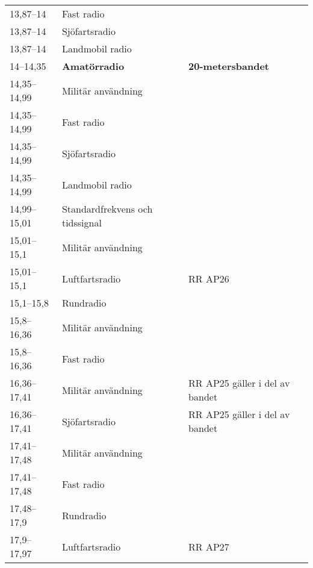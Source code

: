 \begin{landscape}
\begin{longtable}{lll}
13,87--14         & Fast radio                       &                                 \\
13,87--14         & Sjöfartsradio                    &                                 \\
13,87--14         & Landmobil radio                  &                                 \\
14--14,35         & \textbf{Amatörradio}             & \textbf{20-metersbandet}        \\
14,35--14,99      & Militär användning               &                                 \\
14,35--14,99      & Fast radio                       &                                 \\
14,35--14,99      & Sjöfartsradio                    &                                 \\
14,35--14,99      & Landmobil radio                  &                                 \\
14,99--15,01      & Standardfrekvens och tidssignal  &                                 \\
15,01--15,1       & Militär användning               &                                 \\
15,01--15,1       & Luftfartsradio                   & RR AP26                         \\
15,1--15,8        & Rundradio                        &                                 \\
15,8--16,36       & Militär användning               &                                 \\
15,8--16,36       & Fast radio                       &                                 \\
16,36--17,41      & Militär användning               & RR AP25 gäller i del av bandet  \\
16,36--17,41      & Sjöfartsradio                    & RR AP25 gäller i del av bandet  \\
17,41--17,48      & Militär användning               &                                 \\
17,41--17,48      & Fast radio                       &                                 \\
17,48--17,9       & Rundradio                        &                                 \\
17,9--17,97       & Luftfartsradio                   & RR AP27                         \\

\end{longtable}
\end{landscape}
